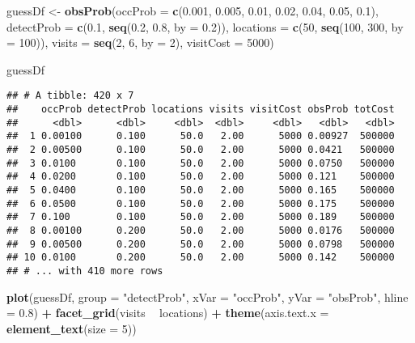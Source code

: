 \documentclass[]{article}
\newenvironment{Shaded}{\begin{snugshade}}{\end{snugshade}}
\newcommand{\KeywordTok}[1]{\textcolor[rgb]{0.13,0.29,0.53}{\textbf{#1}}}
\newcommand{\DataTypeTok}[1]{\textcolor[rgb]{0.13,0.29,0.53}{#1}}
\newcommand{\DecValTok}[1]{\textcolor[rgb]{0.00,0.00,0.81}{#1}}
\newcommand{\FloatTok}[1]{\textcolor[rgb]{0.00,0.00,0.81}{#1}}
\newcommand{\StringTok}[1]{\textcolor[rgb]{0.31,0.60,0.02}{#1}}
\newcommand{\OperatorTok}[1]{\textcolor[rgb]{0.81,0.36,0.00}{\textbf{#1}}}
\newcommand{\NormalTok}[1]{#1}
\begin{document}
\begin{Shaded}
\begin{Highlighting}[]
\NormalTok{guessDf <-}\StringTok{ }\KeywordTok{obsProb}\NormalTok{(}\DataTypeTok{occProb =} \KeywordTok{c}\NormalTok{(}\FloatTok{0.001}\NormalTok{, }\FloatTok{0.005}\NormalTok{, }\FloatTok{0.01}\NormalTok{, }\FloatTok{0.02}\NormalTok{, }\FloatTok{0.04}\NormalTok{, }\FloatTok{0.05}\NormalTok{, }\FloatTok{0.1}\NormalTok{), }\DataTypeTok{detectProb =} \KeywordTok{c}\NormalTok{(}\FloatTok{0.1}\NormalTok{, }
    \KeywordTok{seq}\NormalTok{(}\FloatTok{0.2}\NormalTok{, }\FloatTok{0.8}\NormalTok{, }\DataTypeTok{by =} \FloatTok{0.2}\NormalTok{)), }\DataTypeTok{locations =} \KeywordTok{c}\NormalTok{(}\DecValTok{50}\NormalTok{, }\KeywordTok{seq}\NormalTok{(}\DecValTok{100}\NormalTok{, }\DecValTok{300}\NormalTok{, }\DataTypeTok{by =} \DecValTok{100}\NormalTok{)), }\DataTypeTok{visits =} \KeywordTok{seq}\NormalTok{(}\DecValTok{2}\NormalTok{, }
    \DecValTok{6}\NormalTok{, }\DataTypeTok{by =} \DecValTok{2}\NormalTok{), }\DataTypeTok{visitCost =} \DecValTok{5000}\NormalTok{)}

\NormalTok{guessDf}
\end{Highlighting}
\end{Shaded}

\begin{verbatim}
## # A tibble: 420 x 7
##    occProb detectProb locations visits visitCost obsProb totCost
##      <dbl>      <dbl>     <dbl>  <dbl>     <dbl>   <dbl>   <dbl>
##  1 0.00100      0.100      50.0   2.00      5000 0.00927  500000
##  2 0.00500      0.100      50.0   2.00      5000 0.0421   500000
##  3 0.0100       0.100      50.0   2.00      5000 0.0750   500000
##  4 0.0200       0.100      50.0   2.00      5000 0.121    500000
##  5 0.0400       0.100      50.0   2.00      5000 0.165    500000
##  6 0.0500       0.100      50.0   2.00      5000 0.175    500000
##  7 0.100        0.100      50.0   2.00      5000 0.189    500000
##  8 0.00100      0.200      50.0   2.00      5000 0.0176   500000
##  9 0.00500      0.200      50.0   2.00      5000 0.0798   500000
## 10 0.0100       0.200      50.0   2.00      5000 0.142    500000
## # ... with 410 more rows
\end{verbatim}

\begin{Shaded}
\begin{Highlighting}[]
\KeywordTok{plot}\NormalTok{(guessDf, }\DataTypeTok{group =} \StringTok{"detectProb"}\NormalTok{, }\DataTypeTok{xVar =} \StringTok{"occProb"}\NormalTok{, }\DataTypeTok{yVar =} \StringTok{"obsProb"}\NormalTok{, }\DataTypeTok{hline =} \FloatTok{0.8}\NormalTok{) }\OperatorTok{+}\StringTok{ }
\StringTok{    }\KeywordTok{facet_grid}\NormalTok{(visits }\OperatorTok{~}\StringTok{ }\NormalTok{locations) }\OperatorTok{+}\StringTok{ }\KeywordTok{theme}\NormalTok{(}\DataTypeTok{axis.text.x =} \KeywordTok{element_text}\NormalTok{(}\DataTypeTok{size =} \DecValTok{5}\NormalTok{))}
\end{Highlighting}
\end{Shaded}
\end{document}
